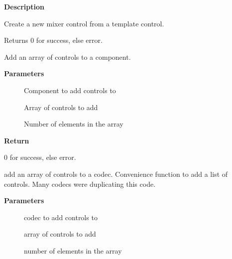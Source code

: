 \documentclass[a4paper,8pt,english]{sphinxmanual}
\begin{document}
\textbf{Description}

Create a new mixer control from a template control.

Returns 0 for success, else error.

\begin{fulllineitems}
\label{sound/kernel-api/alsa-driver-api:c.snd_soc_add_component_controls}
Add an array of controls to a component.

\end{fulllineitems}


\textbf{Parameters}
\begin{description}
\item[{}] \leavevmode
Component to add controls to

\item[{}] \leavevmode
Array of controls to add

\item[{}] \leavevmode
Number of elements in the array

\end{description}

\textbf{Return}

0 for success, else error.

\begin{fulllineitems}
\label{sound/kernel-api/alsa-driver-api:c.snd_soc_add_codec_controls}
add an array of controls to a codec. Convenience function to add a list of controls. Many codecs were duplicating this code.

\end{fulllineitems}


\textbf{Parameters}
\begin{description}
\item[{}] \leavevmode
codec to add controls to

\item[{}] \leavevmode
array of controls to add

\item[{}] \leavevmode
number of elements in the array

\end{description}
\end{document}
